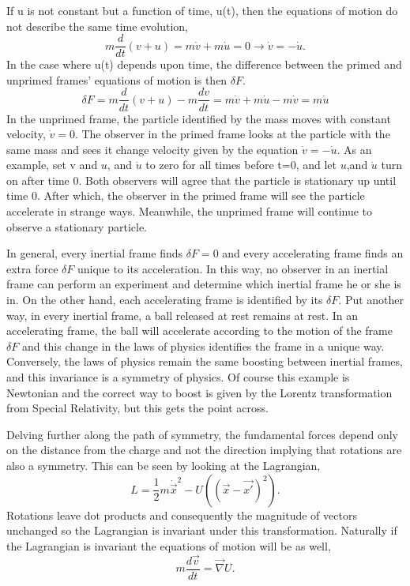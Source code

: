 If u is not constant but a function of time, u(t), then the equations of motion do not describe the same time evolution,
\begin{equation}
m\frac{d}{dt}(v+u) = m\dot{v} + m\dot{u} = 0 \rightarrow \dot{v} = -\dot{u}.
\end{equation}
In the case where u(t) depends upon time, the difference between the primed and unprimed frames' equations of motion is then $\delta F$.
\begin{equation}
\delta F = m\frac{d}{dt}(v+u) - m\frac{dv}{dt} = m\dot{v} + m\dot{u} - m\dot{v} = m\dot{u}
\end{equation}
In the unprimed frame, the particle identified by the mass moves with constant velocity, $\dot{v} = 0$. The observer in the primed frame looks at the particle with the same mass and sees it change velocity given by the equation $\dot{v} = -\dot{u}$. As an example, set v and $u$, and $\dot{u}$ to zero for all times before t=0, and let $u$,and $\dot{u}$ turn on after time 0. Both observers will agree that the particle is stationary up until time 0. After which, the observer in the primed frame will see the particle accelerate in strange ways. Meanwhile, the unprimed frame will continue to observe a stationary particle. 

In general, every inertial frame finds $\delta F = 0$ and every accelerating frame finds an extra force $\delta F$ unique to its acceleration. In this way, no observer in an inertial frame can perform an experiment and determine which inertial frame he or she is in. On the other hand, each accelerating frame is identified by its $\delta F$.  Put another way, in every inertial frame, a ball released at rest remains at rest. In an accelerating frame, the ball will accelerate according to the motion of the frame $\delta F$ and this change in the laws of physics identifies the frame in a unique way. Conversely, the laws of physics remain the same boosting between inertial frames, and this invariance is a symmetry of physics. Of course this example is Newtonian and the correct way to boost is given by the Lorentz transformation from Special Relativity, but this gets the point across.

Delving further along the path of symmetry, the fundamental forces depend only on the distance from the charge and not the direction implying that rotations are also a symmetry. This can be seen by looking at the Lagrangian, 
\begin{equation}
L = \frac{1}{2} m\dot{\vec{x}}^2 - U((\vec{x} - \vec{x'})^2).
\end{equation}
Rotations leave dot products and consequently the magnitude of vectors unchanged so the Lagrangian is invariant under this transformation. Naturally if the Lagrangian is invariant the equations of motion will be as well,
\begin{equation}
\label{eq:symvec}
m\frac{d\vec{v}}{dt} = \vec{\nabla} U.
\end{equation}

